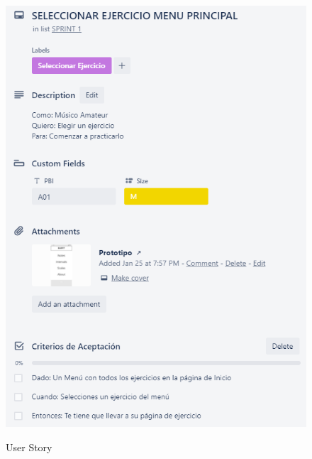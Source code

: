 \documentclass[12pt,twoside,titlepage]{report}
\begin{document}
\begin{figure}[H]
    \centering
    \includegraphics[scale=1.3]{Scrum/User Stories/MenuMain}
    \label{fig:MenuMain}
    \caption{User Story}
\end{figure}
\end{document}
